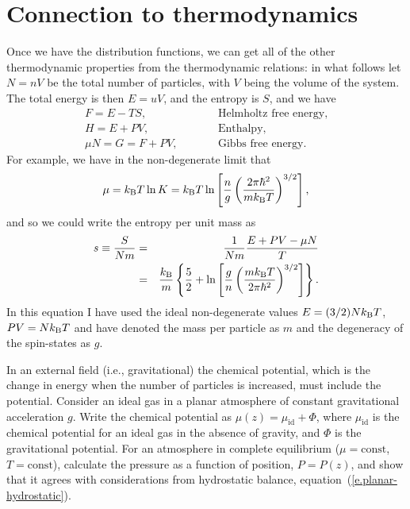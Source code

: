 \section{Connection to thermodynamics}
Once we have the distribution functions, we can get all of the other thermodynamic properties from the thermodynamic relations: in what follows let $N = nV$ be the total number of particles, with $V$ being the volume of the system.  The total energy is then $E = uV$, and the entropy is $S$, and we have
\begin{eqnarray}
F = E - TS, &\qquad& \textrm{Helmholtz free energy,}\\
H = E + PV, &\qquad& \textrm{Enthalpy,}\\
\mu N = G = F + PV, &\qquad& \textrm{Gibbs free energy}.
\end{eqnarray}
For example, we have in the non-degenerate limit that
\begin{equation}\label{e.chem-pot-ideal-gas}
\mu = k_\mathrm{B} T\ln K = k_\mathrm{B} T\ln\left[ \frac{n}{g}\left(\frac{2\pi\hbar^{2}}{mk_\mathrm{B} T}\right)^{3/2}\right],
\end{equation}
and so we could write the entropy per unit mass as
\begin{eqnarray}
s \equiv \frac{S}{Nm} &=& \frac{1}{Nm}\frac{E + PV - \mu N}{T}\nonumber\\
 &=& \frac{k_\mathrm{B} }{m}\left\{ \frac{5}{2} + \ln\left[\frac{g}{n}\left(\frac{mk_\mathrm{B} T}{2\pi\hbar^{2}}\right)^{3/2}\right]\right\}.
\label{e.sacker-tetrode}
 \end{eqnarray}
In this equation I have used the ideal non-degenerate values $E = (3/2) Nk_\mathrm{B} T$, $PV = Nk_\mathrm{B} T$ and have denoted the mass per particle as $m$ and the degeneracy of the spin-states as $g$.

\begin{exercisebox}
In an external field (i.e., gravitational) the chemical potential, which is the change in energy when the number of particles is increased, must include the potential.  Consider an ideal gas in a planar atmosphere of  constant gravitational acceleration $g$.  Write the chemical potential as $\mu(z)  = \mu_{\mathrm{id}} + \Phi$, where $\mu_{\mathrm{id}}$ is the chemical potential for an ideal gas in the absence of gravity, and $\Phi$ is the gravitational potential.  For an atmosphere in complete equilibrium ($\mu = \mathrm{const}$, $T = \mathrm{const}$), calculate the pressure as a function of position, $P = P(z)$, and show that it agrees with considerations from hydrostatic balance, equation~(\ref{e.planar-hydrostatic}).
\end{exercisebox}

